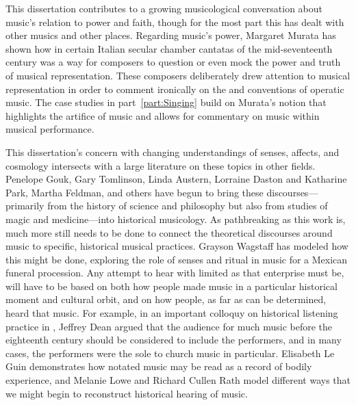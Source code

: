 This dissertation contributes to a growing musicological conversation about music's relation to power and faith, though for the most part this has dealt with other musics and other places.
Regarding music's power, Margaret Murata has shown how  in certain Italian secular chamber cantatas of the mid-seventeenth century was a way for composers to question or even mock the power and truth of musical representation.%
	\autocite{Murata:Singing}
These composers deliberately drew attention to musical representation in order to comment ironically on the  and conventions of operatic music.
The case studies in part~\ref{part:Singing} build on Murata's notion that  highlights the artifice of music and allows for commentary on music within musical performance.

This dissertation's concern with changing understandings of senses, affects, and cosmology intersects with a large literature on these topics in other fields. 
Penelope Gouk, Gary Tomlinson, Linda Austern, Lorraine Daston and Katharine Park, Martha Feldman, and others have begun to bring these discourses---primarily from the history of science and philosophy but also from studies of magic and medicine---into historical musicology.%
	\autocites{Gouk:MusicScienceMagic}{Gouk:Harmonics}{Gouk:Sciences}{Gouk:RepresentingEmotions}{Tomlinson:Magic}{Austern:Nature}{Daston:Wonders}{Feldman:Passions}
As pathbreaking as this work is, much more still needs to be done to connect the theoretical discourses around music to specific, historical musical practices. 
Grayson Wagstaff has modeled how this might be done, exploring the role of senses and ritual in music for a Mexican funeral procession.%
	\autocite{Wagstaff:Processions}	
Any attempt to hear with  limited as that enterprise must be, will have to be based on both how people made music in a particular historical moment and cultural orbit, and on how people, as far as can be determined, heard that music.%
	\autocite{Burstyn:PeriodEar}
For example, in an important colloquy on historical listening practice in , Jeffrey Dean argued that the audience for much music before the eighteenth century should be considered to include the performers, and in many cases, the performers were the sole  to church music in particular.%
	\autocite{Dean:ListeningPolyphony}
Elisabeth Le Guin demonstrates how notated music may be read as a record of bodily experience, and Melanie Lowe and Richard Cullen Rath model different ways that we might begin to reconstruct historical hearing of music.
	\autocites{LeGuin:BoccheriniBody}{Lowe:PleasureSymphony}{Rath:EarlyAmerica}

